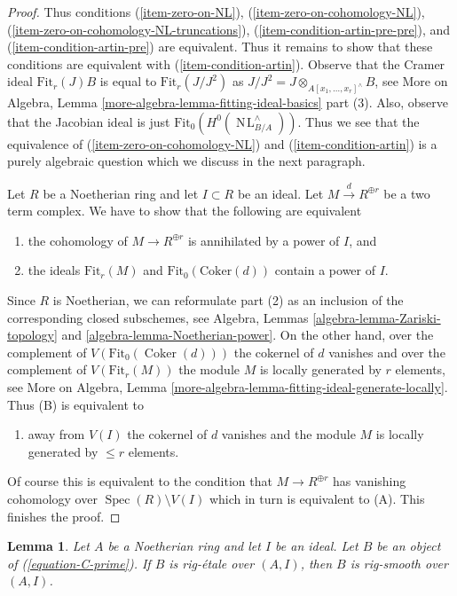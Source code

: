 \documentclass{stacks-project}
\theoremstyle{plain}
\newtheorem{lemma}[subsection]{Lemma}
\theoremstyle{definition}
\theoremstyle{remark}
\numberwithin{equation}{subsection}
\def\Spec{\mathop{\mathrm{Spec}}}
\def\NL{\mathop{N\!L}\nolimits}
\def\Coker{\mathop{\mathrm{Coker}}}
\begin{document}
\begin{proof}
\medskip\noindent
Thus conditions
(\ref{item-zero-on-NL}),
(\ref{item-zero-on-cohomology-NL}),
(\ref{item-zero-on-cohomology-NL-truncations}),
(\ref{item-condition-artin-pre-pre}), and
(\ref{item-condition-artin-pre}) are equivalent.
Thus it remains to show that these conditions are
equivalent with (\ref{item-condition-artin}).
Observe that the Cramer ideal $\text{Fit}_r(J) B$ is
equal to $\text{Fit}_r(J/J^2)$ as
$J/J^2 = J \otimes_{A[x_1, \ldots, x_r]^\wedge} B$, see
More on Algebra, Lemma \ref{more-algebra-lemma-fitting-ideal-basics} part (3).
Also, observe that the Jacobian ideal is just
$\text{Fit}_0(H^0(\NL_{B/A}^\wedge))$.
Thus we see that the equivalence of
(\ref{item-zero-on-cohomology-NL}) and (\ref{item-condition-artin})
is a purely algebraic question which we discuss in the next paragraph.

\medskip\noindent
Let $R$ be a Noetherian ring and let $I \subset R$ be an ideal.
Let $M \xrightarrow{d} R^{\oplus r}$ be a two term complex.
We have to show that the following are equivalent
\begin{enumerate}
\item[(A)] the cohomology of $M \to R^{\oplus r}$ is annihilated by a power
of $I$, and
\item[(B)] the ideals $\text{Fit}_r(M)$ and $\text{Fit}_0(\text{Coker}(d))$
contain a power of $I$.
\end{enumerate}
Since $R$ is Noetherian, we can reformulate part (2) as an inclusion
of the corresponding closed subschemes, see Algebra, Lemmas
\ref{algebra-lemma-Zariski-topology} and \ref{algebra-lemma-Noetherian-power}.
On the other hand, over the complement of $V(\text{Fit}_0(\Coker(d)))$
the cokernel of $d$ vanishes and over the complement of
$V(\text{Fit}_r(M))$ the module $M$ is locally generated by $r$
elements, see
More on Algebra, Lemma \ref{more-algebra-lemma-fitting-ideal-generate-locally}.
Thus (B) is equivalent to
\begin{enumerate}
\item[(C)] away from $V(I)$ the cokernel of $d$ vanishes and
the module $M$ is locally generated by $\leq r$ elements.
\end{enumerate}
Of course this is equivalent to the condition that $M \to R^{\oplus r}$
has vanishing cohomology over $\Spec(R) \setminus V(I)$ which in turn
is equivalent to (A). This finishes the proof.
\end{proof}

\begin{lemma}
\label{lemma-rig-etale-rig-smooth}
Let $A$ be a Noetherian ring and let $I$ be an ideal.
Let $B$ be an object of (\ref{equation-C-prime}).
If $B$ is rig-\'etale over $(A, I)$, then $B$ is rig-smooth over $(A, I)$.
\end{lemma}
\end{document}
